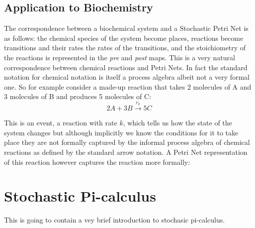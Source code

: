 \subsection{Application to Biochemistry}
The correspondence between a biochemical system and a Stochastic Petri Net is as follows: the chemical species of the system become places, reactions become transitions and their rates the rates of the transitions, and the stoichiometry of the reactions is represented in the \textit{pre} and \textit{post} maps. This is a very natural correspondence between chemical reactions and Petri Nets. In fact the standard notation for chemical notation is itself a process algebra albeit not a very formal one. So for example consider a made-up reaction that takes 2 molecules of A and 3 molecules of B and produces 5 molecules of C:
\begin{equation*}
2A + 3B \overset{r_k}{\longrightarrow} 5C
\end{equation*}

This is an event, a reaction with rate $k$, which tells us how the state of the system changes but although implicitly we know the conditions for it to take place they are not formally captured by the informal process algebra of chemical reactions as defined by the standard arrow notation. A Petri Net representation of this reaction however captures the reaction more formally:


\section{Stochastic Pi-calculus}
This is going to contain a vey brief introduction to stochasic pi-calculus.